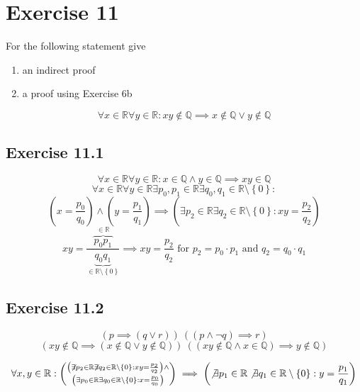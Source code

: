\documentclass[a4paper]{article}
\theoremstyle{definition}
\newcommand\set[1]{\left\{#1\right\}}
\begin{document}
\section{Exercise 11}
\begin{ex}
  For the following statement give
  \begin{enumerate}
    \item an indirect proof
    \item a proof using Exercise 6b
  \end{enumerate}
  \[
      \forall x \in \mathbb R \forall y \in \mathbb R:
      xy \not\in \mathbb Q \implies x \not\in \mathbb Q \lor y \not\in \mathbb Q
  \]
\end{ex}

\subsection{Exercise 11.1}
\[ \forall x \in \mathbb R \forall y \in \mathbb R: x \in \mathbb Q \land y \in \mathbb Q \implies xy \in \mathbb Q \]
\[ \forall x \in \mathbb R \forall y \in \mathbb R \exists p_0, p_1 \in \mathbb R \exists q_0, q_1 \in \mathbb R \setminus \set{0}: \]
\[
    \left(x = \frac{p_0}{q_0}\right) \land \left(y = \frac{p_1}{q_1}\right)
    \implies \left(\exists p_2 \in \mathbb R \exists q_2 \in \mathbb R \setminus \set{0}: xy = \frac{p_2}{q_2} \right)
\] \[
    xy = \frac{\overbrace{p_0 p_1}^{\in \mathbb R}}{\underbrace{q_0 q_1}_{\in \mathbb R \setminus \set{0}}}
    \implies xy = \frac{p_2}{q_2} \text{ for } p_2 = p_0 \cdot p_1 \text{ and } q_2 = q_0 \cdot q_1
\]

\subsection{Exercise 11.2}
\[ (p \implies (q \lor r)) \ ((p \land \neg q) \implies r) \]
\[
    (xy \not\in \mathbb Q \implies \left(x \not\in \mathbb Q \lor y \not\in \mathbb Q\right)) \
    ((xy \not\in \mathbb Q \land x \in \mathbb Q) \implies y \not\in \mathbb Q)
\]

\[
    \forall x,y \in \mathbb R: \left(
      \substack{
      \left(\not\exists p_2 \in \mathbb R \not\exists q_2 \in \mathbb R \setminus \set{0}: xy = \frac{p_2}{q_2}\right) \land \\
      \left(\exists p_0 \in \mathbb R \exists q_0 \in \mathbb R \setminus \set{0}: x = \frac{p_0}{q_0}\right)}
    \right) \implies \left(\not\exists p_1 \in \mathbb R \not\exists q_1 \in \mathbb R \setminus \set{0}: y = \frac{p_1}{q_1}\right)
\]
\end{document}
